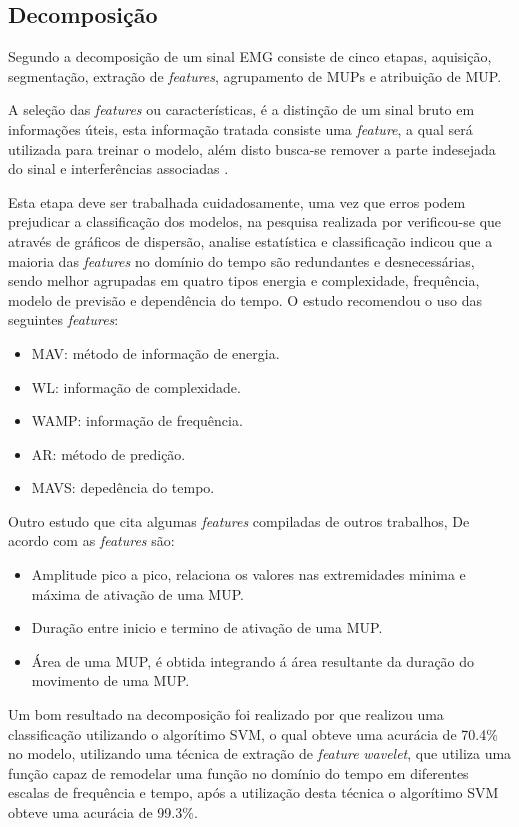 \subsection{Decomposição}
Segundo  a decomposição de um sinal EMG consiste de cinco etapas, aquisição, segmentação, extração de \textit{features}, agrupamento de MUPs e atribuição de MUP.

A seleção das \textit{features} ou características, é a distinção de um sinal bruto em informações úteis, esta informação tratada consiste uma \textit{feature}, a qual será utilizada para treinar o modelo, além disto busca-se remover a parte indesejada do sinal e interferências associadas \cite{phinyomark2012feature}.

Esta etapa deve ser trabalhada cuidadosamente, uma vez que erros podem prejudicar a classificação dos modelos, na pesquisa realizada por \cite{phinyomark2012feature} verificou-se que através de gráficos de dispersão, analise estatística e classificação indicou que a maioria das \textit{features} no domínio do tempo são redundantes e desnecessárias, sendo melhor agrupadas em quatro tipos energia e complexidade, frequência, modelo de previsão e dependência do tempo. O estudo recomendou o uso das seguintes \textit{features}:

\begin{itemize}
    \item MAV: método de informação de energia.
    \item WL: informação de complexidade.
    \item WAMP: informação de frequência.
    \item AR: método de predição.
    \item MAVS: depedência  do tempo.
\end{itemize}

Outro estudo que cita algumas \textit{features} compiladas de outros trabalhos, De acordo com  as \textit{features} são:
\begin{itemize}
    \item Amplitude pico a pico, relaciona os valores nas extremidades minima e máxima de ativação de uma MUP.
    \item Duração entre inicio e termino de ativação de uma MUP.
    \item Área de uma MUP, é obtida integrando á área resultante da duração do movimento de uma MUP.
\end{itemize}

Um bom resultado na decomposição foi realizado por \cite{yousefi2014characterizing} que realizou uma classificação utilizando o algorítimo SVM, o qual obteve uma acurácia de 70.4\% no modelo, utilizando uma técnica de extração de \textit{feature} \textit{wavelet}, que utiliza uma função capaz de remodelar uma função no domínio do tempo em diferentes escalas de frequência e tempo, após a utilização desta técnica o algorítimo SVM obteve uma acurácia de 99.3\%.


